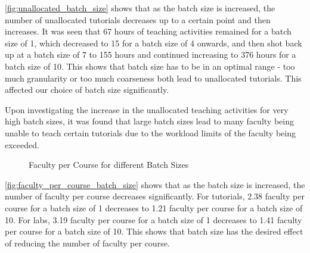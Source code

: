 \autoref{fig:unallocated_batch_size} shows that as the batch size is increased, the number of unallocated tutorials decreases up to a certain point and then increases. It was seen that  67 hours of teaching activities remained for a batch size of 1, which decreased to 15 for a batch size of 4 onwards, and then shot back up at a batch size of 7 to 155 hours and continued increasing to 376 hours for a batch size of 10. This shows that batch size has to be in an optimal range - too much granularity or too much coarseness both lead to unallocated tutorials. This affected our choice of batch size significantly.

Upon investigating the increase in the unallocated teaching activities for very high batch sizes, it was found that large batch sizes lead to many faculty being unable to teach certain tutorials due to the workload limits of the faculty being exceeded.

\begin{figure}[H]
  \centering
  \caption{Faculty per Course for different Batch Sizes}
  \label{fig:faculty_per_course_batch_size}
\end{figure}

\autoref{fig:faculty_per_course_batch_size} shows that as the batch size is increased, the number of faculty per course decreases significantly. For tutorials, 2.38 faculty per course for a batch size of 1 decreases to 1.21 faculty per course for a batch size of 10. For labs, 3.19 faculty per course for a batch size of 1 decreases to 1.41 faculty per course for a batch size of 10. This shows that batch size has the desired effect of reducing the number of faculty per course.

